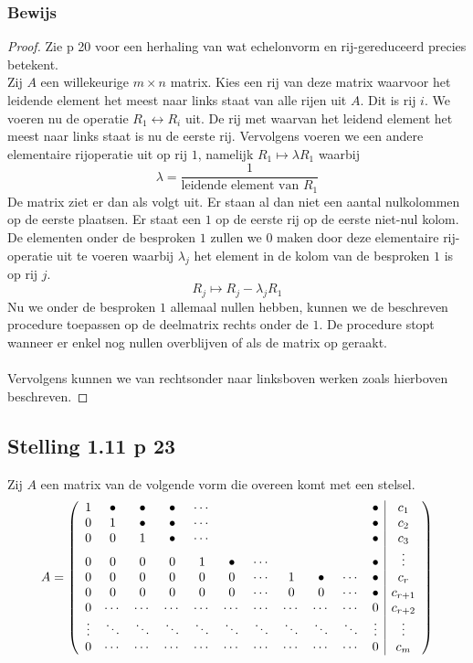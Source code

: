\documentclass[lineaire_algebra_oplossingen.tex]{subfiles}
\begin{document}
\subsubsection*{Bewijs}
\begin{proof}
Zie p 20 voor een herhaling van wat echelonvorm en rij-gereduceerd precies betekent.\\
Zij $A$ een willekeurige $m\times n$ matrix. Kies een rij van deze matrix waarvoor het leidende element het meest naar links staat van alle rijen uit $A$. Dit is rij $i$. We voeren nu de operatie $R_1 \leftrightarrow R_i$ uit. De rij met waarvan het leidend element het meest naar links staat is nu de eerste rij. Vervolgens voeren we een andere elementaire rijoperatie uit op rij $1$, namelijk $R_1\longmapsto \lambda R_1$ waarbij 
\[
\lambda = \frac{1}{\text{leidende element van } R_1}
\]
De matrix ziet er dan als volgt uit. Er staan al dan niet een aantal nulkolommen op de eerste plaatsen. Er staat een $1$ op de eerste rij op de eerste niet-nul kolom.
De elementen onder de besproken $1$ zullen we $0$ maken door deze elementaire rij-operatie uit te voeren waarbij $\lambda_j$ het element in de kolom van de besproken $1$ is op rij $j$.
\[
R_j \longmapsto R_j - \lambda_jR_1
\]
Nu we onder de besproken $1$ allemaal nullen hebben, kunnen we de beschreven procedure toepassen op de deelmatrix rechts onder de $1$. De procedure stopt wanneer er enkel nog nullen overblijven of als de matrix op geraakt.\\\\
Vervolgens kunnen we van rechtsonder naar linksboven werken zoals hierboven beschreven.
\end{proof}


\subsection{Stelling 1.11 p 23}
\label{1.11}
Zij $A$ een matrix van de volgende vorm die overeen komt met een stelsel.
\[
A =
\left(
\begin{array}{c c c c c c c c c c  c | c}
1 & \bullet & \bullet & \bullet & \cdots & & & & & & \bullet & c_1\\
0 & 1 & \bullet & \bullet & \cdots & & & & & & \bullet & c_2\\
0 & 0 & 1 & \bullet & \cdots & & & & & & \bullet & c_3\\
0 & 0 & 0 & 0 & 1 & \bullet & \cdots & & & & \bullet & \vdots\\
0 & 0 & 0 & 0 & 0 & 0 & \cdots & 1 & \bullet & \cdots  & \bullet & c_r\\
0 & 0 & 0 & 0 & 0 & 0 & \cdots & 0 & 0 & \cdots & \bullet & c_{r+1}\\
0 & \cdots & \cdots & \cdots & \cdots & \cdots & \cdots & \cdots & \cdots & \cdots & 0 & c_{r+2}\\
\vdots & \ddots& \ddots& \ddots& \ddots& \ddots& \ddots& \ddots& \ddots & \ddots & \vdots & \vdots\\
0 & \cdots & \cdots & \cdots & \cdots & \cdots & \cdots & \cdots & \cdots & \cdots & 0 & c_{m}\\
\end{array}
\right)
\]
\end{document}
